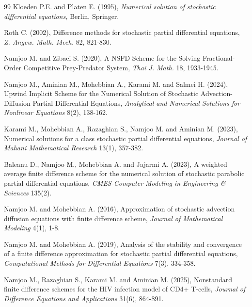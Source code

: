 \documentclass[twoside]{article}
\begin{document}
\begin{thebibliography}{99}
	Kloeden P.E. and Platen E. (1995), {\it Numerical solution of stochastic differential equations,} Berlin, Springer.
	
	Roth C. (2002), Difference methods for stochastic partial differential equations, {\it Z. Angew. Math. Mech.} 82, 821-830.
	
	Namjoo M. and Zibaei S. (2020), A NSFD Scheme for the Solving Fractional-Order Competitive Prey-Predator System, {\it Thai J. Math.} 18, 1933-1945.
	
	Namjoo M., Aminian M., Mohebbian A., Karami M. and Salmei H. (2024), Upwind Implicit Scheme for the Numerical Solution of Stochastic Advection-Diffusion Partial Differential Equations, {\it Analytical and Numerical Solutions for Nonlinear Equations} 8(2), 138-162.
	
	Karami M., Mohebbian A., Razaghian S., Namjoo M. and Aminian M. (2023), Numerical solutions for a class stochastic partial differential equations, {\it Journal of Mahani Mathematical Research} 13(1), 357-382.
	
	Baleanu D., Namjoo M., Mohebbian A. and Jajarmi A. (2023), A weighted average finite difference scheme for the numerical solution of stochastic parabolic partial differential equations, {\it CMES-Computer Modeling in Engineering \& Sciences} 135(2).
	
	Namjoo M. and Mohebbian A. (2016), Approximation of stochastic advection diffusion equations with finite difference scheme, {\it Journal of Mathematical Modeling} 4(1), 1-8.
	
	Namjoo M. and Mohebbian A. (2019), Analysis of the stability and convergence of a finite difference approximation for stochastic partial differential equations, {\it Computational Methods for Differential Equations} 7(3), 334-358.
	
	Namjoo M., Razaghian S., Karami M. and Aminian M. (2025), Nonstandard finite difference schemes for the HIV infection model of CD4+ T-cells, {\it Journal of Difference Equations and Applications} 31(6), 864-891.
	

\end{thebibliography}
\end{document}

